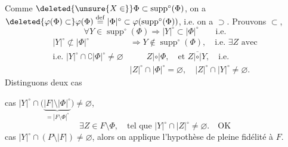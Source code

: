  Comme $\deleted{\unsure{X\in}}\Phi\subset\operatorname{supp}^{\circ}(\Phi)$, on a $\deleted{\varphi(\Phi)\subset}\varphi(\Phi)\overset{\mathrm{def}}{=}|\Phi|^{\circ}\subset\varphi(\operatorname{supp}^{\circ}(\Phi))$, i.e. on a $\supset$. Prouvons $\subset$, 
\[
\forall Y\in\operatorname{supp}^{\circ}(\Phi)\Longrightarrow |Y|^{\circ}\subset|\Phi|^{\circ}\qquad\text{i.e.}
\]
\[
\begin{aligned}
|Y|^{\circ}\not\subset|\Phi|^{\circ}&\Longrightarrow Y\notin\operatorname{supp}^{\circ}(\Phi),\quad\text{i.e. }\exists Z\text{ avec}\\
\text{i.e. }|Y|^{\circ}\cap\complement|\Phi|^{\circ}\neq\varnothing
&\qquad Z\mathrel{|\circ|}\Phi,\quad\text{et }Z\mathrel{\overline{|\circ|}}Y,\quad\text{i.e.}\\
&|Z|^{\circ}\cap|\Phi|^{\circ}=\varnothing,\quad|Z|^{\circ}\cap|Y|^{\circ}\neq\varnothing.
\end{aligned}
\]
Distinguons deux cas

cas $|Y|^{\circ}\cap\bigl(\underbrace{|F|\setminus|\Phi|^{\circ}}_{=|F\setminus\Phi|^{\circ}}\bigr)\neq\varnothing$, 
\[
\exists Z\in F\setminus\Phi,\quad\text{tel que }|Y|^{\circ}\cap|Z|^{\circ}\neq\varnothing.\quad\text{OK}
\]
cas $|Y|^{\circ}\cap(P\setminus|F|)\neq\varnothing$, alors on applique l'hypothèse de pleine fidélité à $F$.
